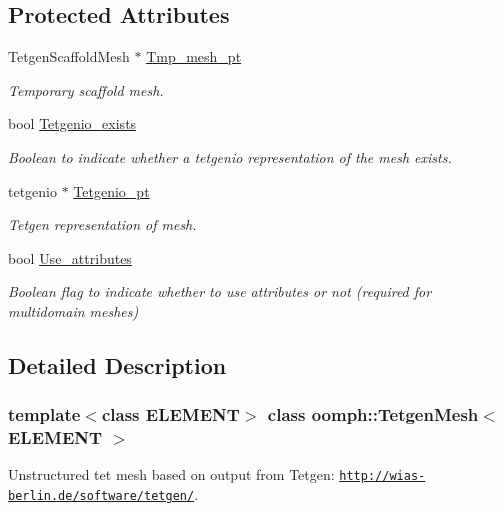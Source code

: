 \subsection*{Protected Attributes}
\begin{DoxyCompactItemize}
\item 
Tetgen\+Scaffold\+Mesh $\ast$ \hyperlink{classoomph_1_1TetgenMesh_ac11e90fcf927bbf8317800db7723bad2}{Tmp\+\_\+mesh\+\_\+pt}
\begin{DoxyCompactList}\small\item\em Temporary scaffold mesh. \end{DoxyCompactList}\item 
bool \hyperlink{classoomph_1_1TetgenMesh_ab9aa31216620790d084d133b8781be37}{Tetgenio\+\_\+exists}
\begin{DoxyCompactList}\small\item\em Boolean to indicate whether a tetgenio representation of the mesh exists. \end{DoxyCompactList}\item 
tetgenio $\ast$ \hyperlink{classoomph_1_1TetgenMesh_a508672e33aa773da58c834a526cb5c59}{Tetgenio\+\_\+pt}
\begin{DoxyCompactList}\small\item\em Tetgen representation of mesh. \end{DoxyCompactList}\item 
bool \hyperlink{classoomph_1_1TetgenMesh_a94c4ac3940ecfdd87679167d300ce75d}{Use\+\_\+attributes}
\begin{DoxyCompactList}\small\item\em Boolean flag to indicate whether to use attributes or not (required for multidomain meshes) \end{DoxyCompactList}\end{DoxyCompactItemize}


\subsection{Detailed Description}
\subsubsection*{template$<$class E\+L\+E\+M\+E\+NT$>$\newline
class oomph\+::\+Tetgen\+Mesh$<$ E\+L\+E\+M\+E\+N\+T $>$}

Unstructured tet mesh based on output from Tetgen\+: \href{http://wias-berlin.de/software/tetgen/}{\tt http\+://wias-\/berlin.\+de/software/tetgen/}. 

